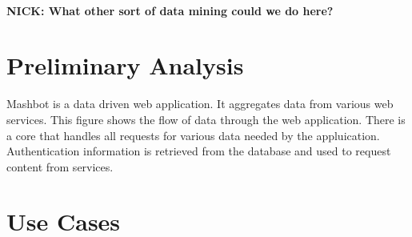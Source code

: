 \documentclass{article}
\begin{document}
        \paragraph{NICK: What other sort of data mining could we do here?}

\section{Preliminary Analysis} %
Mashbot is a data driven web application.  It aggregates data from various web services.  This figure shows the flow of data through the web application.
There is a core that handles all requests for various data needed by the appluication.  Authentication information is retrieved from the database and used to request content from services.

\section{Use Cases} %



    
  
\end{document}
